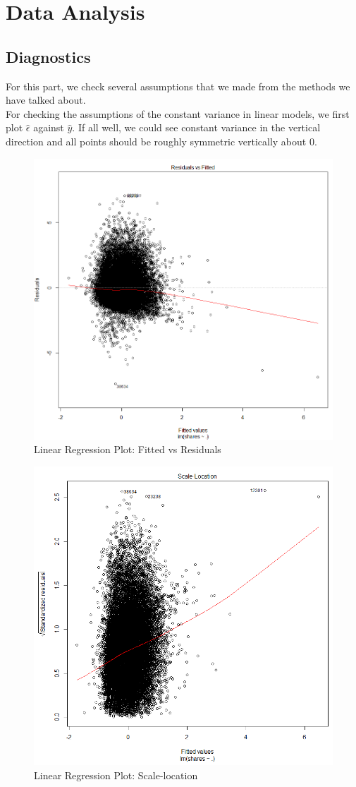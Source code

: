 \documentclass[12pt]{article}
\begin{document}
\section{Data Analysis}
\subsection{Diagnostics}
For this part, we check several assumptions that we made from the methods we have talked about.\cite[p58-82]{faraway2014linear} \\
For checking the assumptions of the constant variance in linear models, we first plot $\hat \epsilon$ against $\hat y$. If all well, we could see constant variance in the vertical direction and all points should be roughly symmetric vertically about 0.\\

    \begin{figure}[h]
        \centering
        \includegraphics[width=0.7\linewidth]{linear_fvsr.png}
        \caption{Linear Regression Plot: Fitted vs Residuals}
        \label{fig:frp}
    \end{figure}  
    
    \begin{figure}[h]
        \centering
        \includegraphics[width=0.7\linewidth]{linear_sl.png}
        \caption{Linear Regression Plot: Scale-location}
        \label{fig:sclo}
    \end{figure}
    
\end{document}
